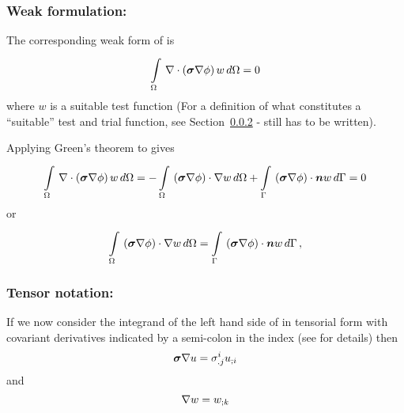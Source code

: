 \subsubsection{Weak formulation:}

The corresponding weak form of  is
\begin{equation}
  \gint{\Omega}{}{\divergence{}{\pbrac{\tensor{\sigma}\gradient{}{\phi}}}w}{\Omega}=0 
  \label{eqn:Laplaceweakform}
\end{equation}
where $w$ is a suitable test function (For a definition of what constitutes a
``suitable'' test and trial function, see Section~\ref{} - still has to be written).

Applying Green's theorem to  gives
\begin{equation}
 \gint{\Omega}{}{\divergence{}{\pbrac{\tensor{\sigma}\gradient{}{\phi}}}w}{\Omega}
 = -\gint{\Omega}{}{\dotprod{\pbrac{\tensor{\sigma}\gradient{}{\phi}}}{\gradient{}{w}}}{\Omega}
   +\gint{\Gamma}{}{\dotprod{\pbrac{\tensor{\sigma}\gradient{}{\phi}}}{\vectr{n}}w}{\Gamma}
 = 0
\end{equation}
or
\begin{equation}
  \gint{\Omega}{}{\dotprod{\pbrac{\tensor{\sigma}\gradient{}{\phi}}}{\gradient{}{w}}}{\Omega}
  = \gint{\Gamma}{}{\dotprod{\pbrac{\tensor{\sigma}\gradient{}{\phi}}}{\vectr{n}w}}{\Gamma} \,,
  \label{eqn:Laplaceweightedresidualform}
\end{equation}

\subsubsection{Tensor notation:}

If we now consider the integrand of the left hand side of
 in tensorial form with covariant
derivatives indicated by a semi-colon in the index
(see  for details) then
\begin{equation}
  \tensor{\sigma}\gradient{}{u} = \sigma^{i}_{.j}\covarderiv{u}{i}
  \label{eqn:Laplaceweakformfactor1}
\end{equation}
and
\begin{equation}
  \gradient{}{w} = \covarderiv{w}{k}
  \label{eqn:Laplaceweakformfactor2}
\end{equation}

